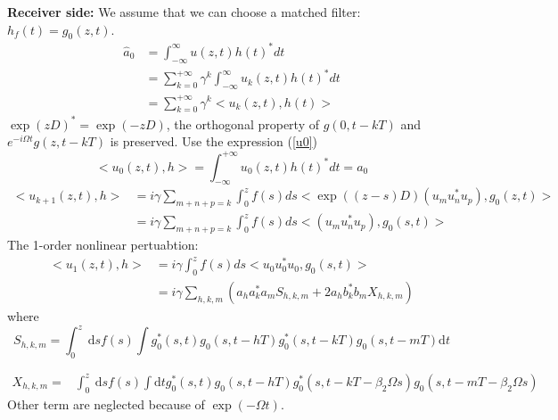 \textbf{Receiver side:}
We assume that we can choose a matched filter: $h_f(t) = g_0(z,t)$.
\begin{align*}
\hat{a}_0 &= \int_{-\infty}^{\infty} u(z,t)h(t)^*dt \\
&=\sum_{k=0}^{+\infty} \gamma^k \int_{-\infty}^{\infty} u_k(z,t)h(t)^*dt\\
&=\sum_{k=0}^{+\infty} \gamma^k <u_k(z,t),h(t)>
\end{align*}
$\exp(zD)^{*} = \exp(-zD)$, the orthogonal property of $g(0,t-kT)$ and $e^{-i \Omega t} g\left(z, t-k T\right)$ is preserved. Use the expression (\ref{u0})
$$
<u_0(z,t),h> = \int_{-\infty}^{+\infty} u_0(z,t)h(t)^* dt= a_0
$$
\begin{align*}
<u_{k+1}(z,t),h> &= i\gamma \sum_{m+n+p=k} \int_{0}^{z} f(s)ds<\exp\left( (z-s)D \right)(u_mu_n^*u_p),g_0(z,t)> \\
& = i\gamma \sum_{m+n+p=k} \int_{0}^{z} f(s)ds<(u_mu_n^*u_p),g_0(s,t)> 
\end{align*}
The 1-order nonlinear pertuabtion:
\begin{align*}
<u_{1}(z,t),h> &= i\gamma  \int_{0}^{z} f(s)ds<u_0u_0^*u_0,g_0(s,t)> \\
&= i \gamma \sum_{h, k, m}\left(a_{h} a_{k}^{*} a_{m} S_{h, k, m}+2 a_{h} b_{k}^{*} b_{m} X_{h, k, m}\right)
\end{align*}
where
$$
S_{h, k, m}=\int_{0}^{z} \mathrm{~d} s f(s) \int  g_0^*(s, t) g_0(s, t-h T) g_0^{*}(s, t-k T) g_0(s, t-m T) \mathrm{d} t
$$

$$
\begin{aligned}
X_{h, k, m}=& \int_{0}^{z} \mathrm{~d} s f(s) \int \mathrm{d} t g_0^*(s, t) g_0(s, t-h T) 
 g_0^*\left(s, t-k T-\beta_2 \Omega s\right) g_0\left(s, t-m T-\beta_2 \Omega s\right)
\end{aligned}
$$
Other term are neglected because of $\exp(-\Omega t)$.












